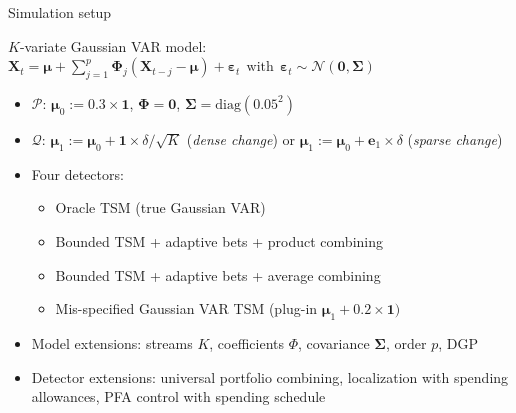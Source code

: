 \documentclass[10pt,aspectratio=169]{beamer}
\newcommand{\bs}{\boldsymbol}
\begin{document}

\begin{frame}{Simulation setup}
  
      $K$-variate Gaussian VAR model:
      $\bs{X}_t = \bs{\mu} + \sum_{j=1}^p \bs{\Phi}_j (\bs{X}_{t-j} - \bs{\mu}) + \bs{\varepsilon}_t ~~\mbox{with}~~ \bs{\varepsilon}_t \sim \mathcal{N}(\bs{0}, \bs{\Sigma})$
  \begin{itemize}
  \item $\mathcal{P}$: $\bs{\mu}_0 := 0.3 \times \bs{1}$, $\bs{\Phi} = \bs{0}$, $\bs{\Sigma} = \mbox{diag}(0.05^2)$ 
  \item $\mathcal{Q}$: $\bs{\mu}_1 := \bs{\mu}_0 + {\bs{1}} \times \delta / \sqrt{K}$ (\textit{dense change}) or  $\bs{\mu}_1 := \bs{\mu}_0 +  {\bs{e}_1} \times \delta$ (\textit{sparse change})
  \item Four detectors:
  \begin{itemize}
      \item Oracle TSM (true Gaussian VAR)
      \item Bounded TSM + adaptive bets + product combining 
      \item Bounded TSM + adaptive bets + average combining
      \item Mis-specified Gaussian VAR TSM (plug-in $\bs{\mu}_1 + 0.2 \times \bs{1})$
  \end{itemize}
  \item Model extensions: streams $K$, coefficients $\Phi$, covariance $\bs{\Sigma}$, order $p$, DGP
  \item Detector extensions: universal portfolio combining, localization with spending allowances, PFA control with spending schedule
  \end{itemize}
\end{frame}
\end{document}
